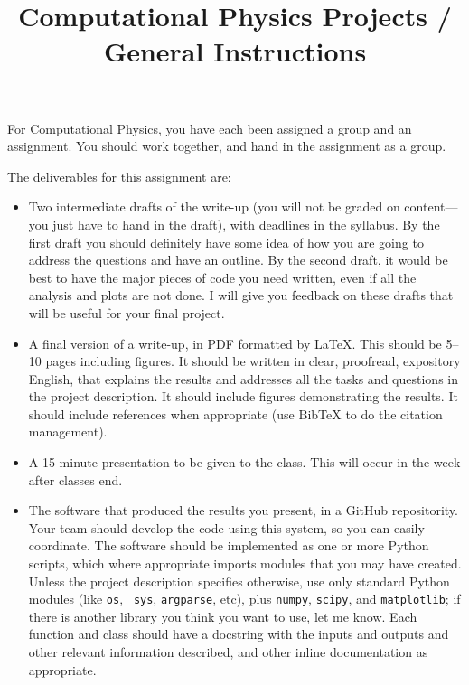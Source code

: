 \documentclass[11pt, preprint]{aastex}
\begin{document}
\title{\bf Computational Physics Projects / General Instructions}

For Computational Physics, you have each been assigned a group and an
assignment. You should work together, and hand in the assignment as a
group.

The deliverables for this assignment are:
\begin{itemize}
\item Two intermediate drafts of the write-up (you will not be graded
  on content---you just have to hand in the draft), with deadlines in
  the syllabus. By the first draft you should definitely have some
  idea of how you are going to address the questions and have an
  outline. By the second draft, it would be best to have the major
  pieces of code you need written, even if all the analysis and plots
  are not done. I will give you feedback on these drafts that will be
  useful for your final project.
\item A final version of a write-up, in PDF formatted by \LaTeX. This
  should be 5--10 pages including figures. It should be written in
  clear, proofread, expository English, that explains the results and
  addresses all the tasks and questions in the project description. It
  should include figures demonstrating the results. It should include
  references when appropriate (use BibTeX to do the citation
  management).
\item A 15 minute presentation to be given to the class. This will
  occur in the week after classes end.
\item The software that produced the results you present, in a GitHub
  repositority. Your team should develop the code using this system,
  so you can easily coordinate. The software should be implemented as
  one or more Python scripts, which where appropriate imports modules
  that you may have created. Unless the project description specifies
  otherwise, use only standard Python modules (like {\tt os}, {\tt
    sys}, {\tt argparse}, etc), plus {\tt numpy}, {\tt scipy}, and
  {\tt matplotlib}; if there is another library you think you want to
  use, let me know. Each function and class should have a docstring
  with the inputs and outputs and other relevant information
  described, and other inline documentation as appropriate.
\end{itemize}
\end{document}
